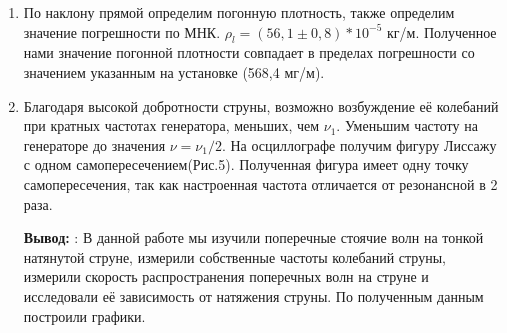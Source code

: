 \documentclass[a4paper, 12pt]{article}%
\begin{document}
\begin{enumerate}
\item По наклону прямой определим погонную плотность, также определим значение погрешности по МНК. $\rho_l=(56,1\pm 0,8)*10^{-5}$ кг/м. Полученное нами значение погонной плотности совпадает в пределах погрешности со значением указанным на установке (568,4 мг/м).

\item Благодаря высокой добротности струны, возможно возбуждение её
колебаний при кратных частотах генератора, меньших, чем $\nu_1$. Уменьшим частоту на генераторе до значения $\nu=\nu_1 /2$. На осциллографе получим фигуру Лиссажу с одном самопересечением(Рис.5). Полученная фигура имеет одну точку самопересечения, так как настроенная частота отличается от резонансной в 2 раза.


\begin{figure}[H]
	\caption{}
\end{figure}
  \textbf{Вывод:} : В данной работе мы изучили поперечные стоячие волн на тонкой натянутой струне, измерили собственные частоты колебаний струны, измерили скорость распространения поперечных волн на струне и исследовали её зависимость от натяжения струны. По полученным данным построили  графики.


\end{enumerate}
\end{document}
